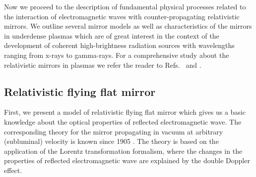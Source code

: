 \documentclass[10pt, a4paper, twoside, openright]{report}
\begin{document}
%

%

%

%

Now we proceed to the description of fundamental physical processes related to the interaction of electromagnetic waves with counter-propagating relativistic mirrors. We outline several mirror models as well as characteristics of the mirrors in underdense plasmas which are of great interest in the context of the development of coherent high-brightness radiation sources with wavelengths ranging from x-rays to gamma-rays. For a comprehensive study about the relativistic mirrors in plasmas we refer the reader to Refs.~ and .


\subsection{Relativistic flying flat mirror\label{sec:rffm}}


First, we present a model of relativistic flying flat mirror which gives us a basic knowledge about the optical properties of reflected electromagnetic wave. The corresponding theory for the mirror propagating in vacuum at arbitrary (subluminal) velocity is known since 1905 \cite{Einstein1905}. The theory is based on the application of the Lorentz transformation formalism, where the changes in the properties of reflected electromagnetic wave are explained by the double Doppler effect.
\end{document}
